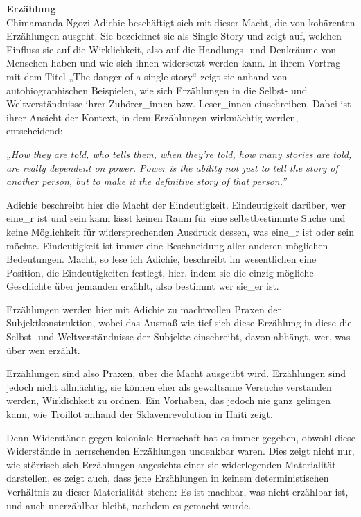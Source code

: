 \textbf{\large Erzählung}\\

Chimamanda Ngozi Adichie beschäftigt sich mit dieser Macht, die von kohärenten
Erzählungen ausgeht. Sie bezeichnet sie als Single Story und zeigt auf, welchen
Einfluss sie auf die Wirklichkeit, also auf die Handlungs- und Denkräume von
Menschen haben und wie sich ihnen widersetzt werden kann. In ihrem Vortrag mit
dem Titel „The danger of a single story“ zeigt sie anhand von
autobiographischen Beispielen, wie sich Erzählungen in die Selbst- und
Weltverständnisse ihrer Zuhörer\_innen bzw. Leser\_innen einschreiben. Dabei ist
ihrer Ansicht der Kontext, in dem Erzählungen wirkmächtig werden, entscheidend:

\begin{myenv}
  \textit{„How they are told, who tells them, when they're told, how many
stories are told, are really dependent on power. Power is the ability not just
to tell the story of another person, but to make it the definitive story of
that person.”\footnotemark{} } 
\end{myenv}

Adichie beschreibt hier die Macht der Eindeutigkeit. Eindeutigkeit darüber, wer
eine\_r ist und sein kann lässt keinen Raum für eine selbstbestimmte Suche und
keine Möglichkeit für widersprechenden Ausdruck dessen, was eine\_r ist oder
sein möchte. Eindeutigkeit ist immer eine Beschneidung aller anderen möglichen
Bedeutungen. Macht, so lese ich Adichie, beschreibt im wesentlichen eine
Position, die Eindeutigkeiten festlegt, hier, indem sie die einzig mögliche
Geschichte über jemanden erzählt, also bestimmt wer sie\_er ist.

Erzählungen werden hier mit Adichie zu machtvollen Praxen der
Subjektkonstruktion, wobei das Ausmaß wie tief sich diese Erzählung in diese
die Selbst- und Weltverständnisse der Subjekte einschreibt, davon abhängt, wer,
was über wen erzählt.

Erzählungen sind also Praxen, über die Macht ausgeübt wird. Erzählungen sind
jedoch nicht allmächtig, sie können eher als gewaltsame Versuche verstanden
werden, Wirklichkeit zu ordnen. Ein Vorhaben, das jedoch nie ganz gelingen
kann, wie Troillot anhand der Sklavenrevolution in Haiti zeigt.

Denn Widerstände gegen koloniale Herrschaft hat es immer gegeben, obwohl diese
Widerstände in  herrschenden Erzählungen undenkbar waren. Dies zeigt nicht nur,
wie störrisch sich Erzählungen angesichts einer sie widerlegenden Materialität
darstellen, es zeigt auch, dass jene Erzählungen in keinem deterministischen
Verhältnis zu dieser Materialität stehen: Es ist machbar, was nicht erzählbar
ist, und auch unerzählbar bleibt, nachdem es gemacht wurde.

